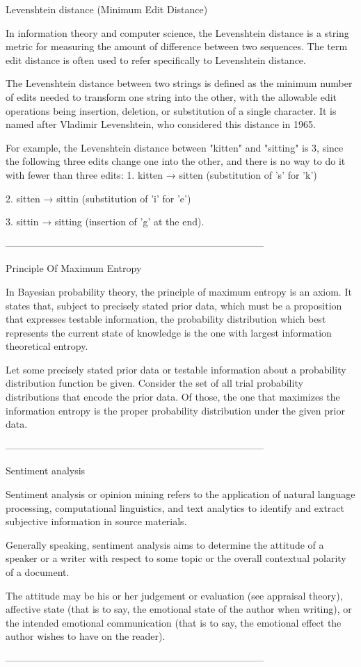 Levenshtein distance (Minimum Edit Distance)


In information theory and computer science, the Levenshtein distance is a string metric for measuring the amount of difference between two sequences. The term edit distance is often used to refer specifically to Levenshtein distance.


The Levenshtein distance between two strings is defined as the minimum number of edits needed to transform one string into the other, with the allowable edit operations being insertion, deletion, or substitution of a single character. It is named after Vladimir Levenshtein, who considered this distance in 1965.


For example, the Levenshtein distance between "kitten" and "sitting" is 3, since the following three edits change one into the other, and there is no way to do it with fewer than three edits:
1.
kitten → sitten (substitution of 's' for 'k')

2.
sitten → sittin (substitution of 'i' for 'e')

3.
sittin → sitting (insertion of 'g' at the end).




--------------------------------------------------------------------------------



Principle Of Maximum Entropy


In Bayesian probability theory, the principle of maximum entropy is an axiom. It states that, subject to precisely stated prior data, which must be a proposition that expresses testable information, the probability distribution which best represents the current state of knowledge is the one with largest information theoretical entropy.


Let some precisely stated prior data or testable information about a probability distribution function be given. Consider the set of all trial probability distributions that encode the prior data. Of those, the one that maximizes the information entropy is the proper probability distribution under the given prior data.




--------------------------------------------------------------------------------


Sentiment analysis


Sentiment analysis or opinion mining refers to the application of natural language processing, computational linguistics, and text analytics to identify and extract subjective information in source materials.

Generally speaking, sentiment analysis aims to determine the attitude of a speaker or a writer with respect to some topic or the overall contextual polarity of a document. 

The attitude may be his or her judgement or evaluation (see appraisal theory), affective state (that is to say, the emotional state of the author when writing), or the intended emotional communication (that is to say, the emotional effect the author wishes to have on the reader).




--------------------------------------------------------------------------------


